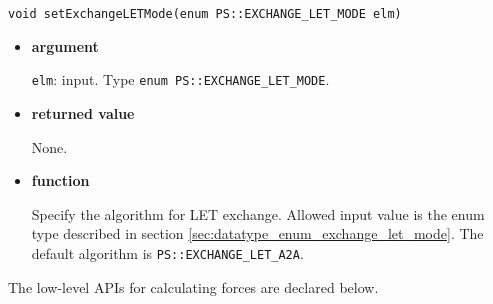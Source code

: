 \label{sec:module_standard_treeforce_setexchangeletmode}

\begin{screen}
\begin{verbatim}
void setExchangeLETMode(enum PS::EXCHANGE_LET_MODE elm)
\end{verbatim}
\end{screen}

\begin{itemize}

\item {\bf argument}

{\tt elm}: input. Type {\tt enum PS::EXCHANGE\_LET\_MODE}.

\item {\bf returned value}

None.

\item {\bf function}

Specify the algorithm for LET exchange. Allowed input value is
the enum type described in
section \ref{sec:datatype_enum_exchange_let_mode}.
The default algorithm is {\tt PS::EXCHANGE\_LET\_A2A}.







\end{itemize}


The low-level APIs for calculating forces are declared below.

